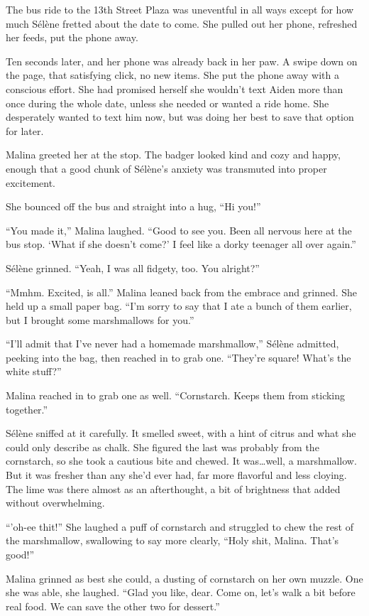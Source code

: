 The bus ride to the 13th Street Plaza was uneventful in all ways except for how much Sélène fretted about the date to come. She pulled out her phone, refreshed her feeds, put the phone away.

Ten seconds later, and her phone was already back in her paw. A swipe down on the page, that satisfying click, no new items. She put the phone away with a conscious effort. She had promised herself she wouldn't text Aiden more than once during the whole date, unless she needed or wanted a ride home. She desperately wanted to text him now, but was doing her best to save that option for later.

Malina greeted her at the stop. The badger looked kind and cozy and happy, enough that a good chunk of Sélène's anxiety was transmuted into proper excitement.

She bounced off the bus and straight into a hug, ``Hi you!''

``You made it,'' Malina laughed. ``Good to see you. Been all nervous here at the bus stop. `What if she doesn't come?' I feel like a dorky teenager all over again.''

Sélène grinned. ``Yeah, I was all fidgety, too. You alright?''

``Mmhm. Excited, is all.'' Malina leaned back from the embrace and grinned. She held up a small paper bag. ``I'm sorry to say that I ate a bunch of them earlier, but I brought some marshmallows for you.''

``I'll admit that I've never had a homemade marshmallow,'' Sélène admitted, peeking into the bag, then reached in to grab one. ``They're square! What's the white stuff?''

Malina reached in to grab one as well. ``Cornstarch. Keeps them from sticking together.''

Sélène sniffed at it carefully. It smelled sweet, with a hint of citrus and what she could only describe as chalk. She figured the last was probably from the cornstarch, so she took a cautious bite and chewed. It was\ldots{}well, a marshmallow. But it was fresher than any she'd ever had, far more flavorful and less cloying. The lime was there almost as an afterthought, a bit of brightness that added without overwhelming.

``'oh-ee thit!'' She laughed a puff of cornstarch and struggled to chew the rest of the marshmallow, swallowing to say more clearly, ``Holy shit, Malina. That's good!''

Malina grinned as best she could, a dusting of cornstarch on her own muzzle. One she was able, she laughed. ``Glad you like, dear. Come on, let's walk a bit before real food. We can save the other two for dessert.''

